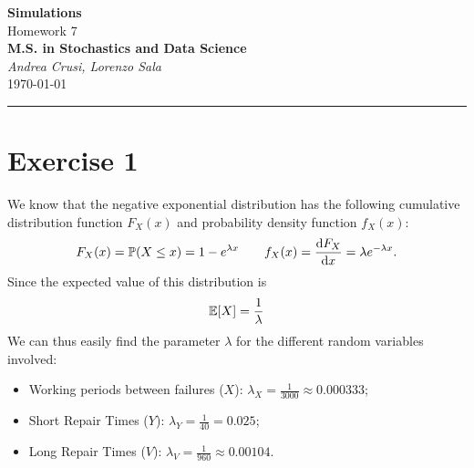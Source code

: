 \documentclass[12pt]{article}
\begin{document}
	\textcolor{UM_Brown}{
		\begin{center}
			\textbf{\Large Simulations}\\
			\vspace{5pt}
			Homework 7 \\
			\vspace{5pt}
			\textbf{M.S. in Stochastics and Data Science}\\
			\vspace{20pt}
			\textit{Andrea Crusi, Lorenzo Sala} \\
			\vspace{5pt}
			\today
		\end{center}
		\vspace{10pt}
		\hrule
	}
	
	
	
	\section{Exercise 1}
	We know that the negative exponential distribution has the following cumulative distribution function $F_X(x)$ and probability density function $f_X(x)$:
	\begin{equation*}
		F_X(x)=\mathbb{P}(X\leq x)=1-e^{\lambda x}\qquad f_X(x)=\frac{\mathop{}\!\mathrm{d} F_X}{\mathop{}\!\mathrm{d} x}=\lambda e^{-\lambda x}.
	\end{equation*}
	Since the expected value of this distribution is
	\begin{equation*}
		\mathbb{E}[X]=\frac{1}{\lambda}
	\end{equation*}
	We can thus easily find the parameter $\lambda$ for the different random variables involved:
	\begin{itemize}
		\item Working periods between failures ($X$): $\lambda_X=\frac{1}{3000}\approx0.000333$;
		\item Short Repair Times ($Y$): $\lambda_Y=\frac{1}{40}=0.025$;
		\item Long Repair Times ($V$): $\lambda_V=\frac{1}{960}\approx 0.00104$.
	\end{itemize}
\end{document}
